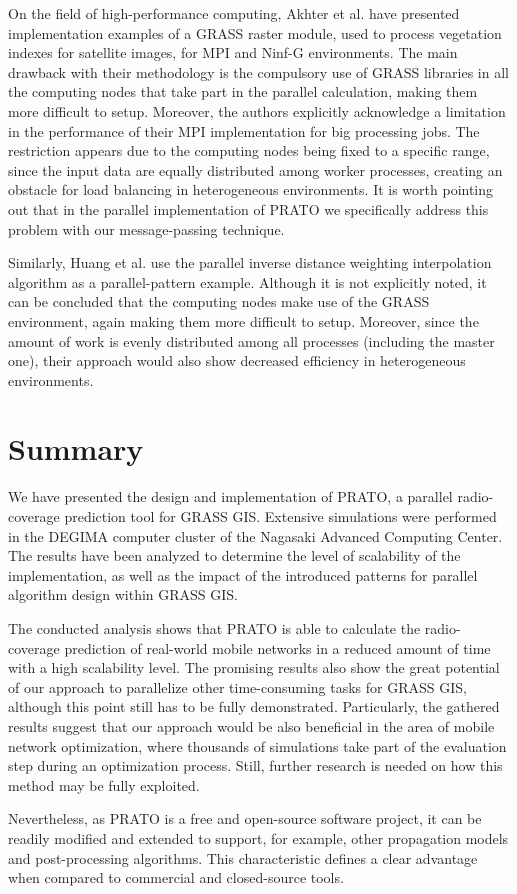 On the field of high-performance computing, Akhter et al. \cite{Akhter_Porting_GRASS_raster_module_to_distributed_computing:2007}
have presented implementation examples of a GRASS raster module, used
to process vegetation indexes for satellite images, for MPI and Ninf-G
environments. The main drawback with their methodology is the compulsory
use of GRASS libraries in all the computing nodes that take part in
the parallel calculation, making them more difficult to setup. Moreover,
the authors explicitly acknowledge a limitation in the performance
of their MPI implementation for big processing jobs. The restriction
appears due to the computing nodes being fixed to a specific range,
since the input data are equally distributed among worker processes,
creating an obstacle for load balancing in heterogeneous environments.
It is worth pointing out that in the parallel implementation of PRATO
we specifically address this problem with our message-passing technique.

Similarly, Huang et al. \cite{Huang_Cluster_based_parallel_GIS:2011}
use the parallel inverse distance weighting interpolation algorithm
as a parallel-pattern example. Although it is not explicitly noted,
it can be concluded that the computing nodes make use of the GRASS
environment, again making them more difficult to setup. Moreover,
since the amount of work is evenly distributed among all processes
(including the master one), their approach would also show decreased
efficiency in heterogeneous environments.


\section{Summary}

We have presented the design and implementation of PRATO, a parallel
radio-coverage prediction tool for GRASS GIS. Extensive simulations
were performed in the DEGIMA computer cluster of the Nagasaki Advanced
Computing Center. The results have been analyzed to determine the
level of scalability of the implementation, as well as the impact
of the introduced patterns for parallel algorithm design within GRASS
GIS.

The conducted analysis shows that PRATO is able to calculate the radio-coverage
prediction of real-world mobile networks in a reduced amount of time
with a high scalability level. The promising results also show the
great potential of our approach to parallelize other time-consuming
tasks for GRASS GIS, although this point still has to be fully demonstrated.
Particularly, the gathered results suggest that our approach would
be also beneficial in the area of mobile network optimization, where
thousands of simulations take part of the evaluation step during an
optimization process. Still, further research is needed on how this
method may be fully exploited.

Nevertheless, as PRATO is a free and open-source software project,
it can be readily modified and extended to support, for example, other
propagation models and post-processing algorithms. This characteristic
defines a clear advantage when compared to commercial and closed-source
tools.
